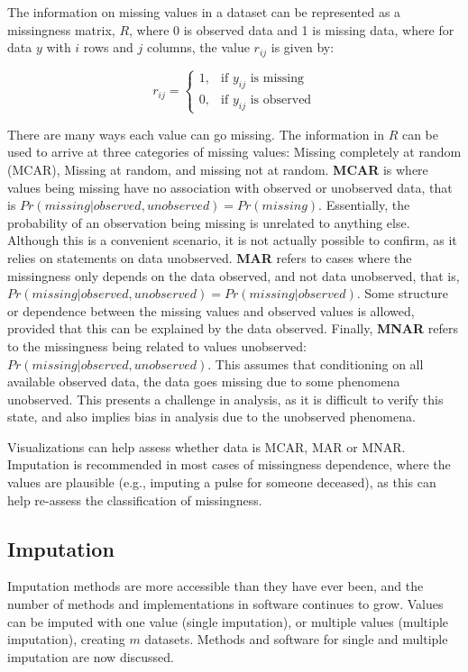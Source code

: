 \documentclass[]{article}
\theoremstyle{definition}
\theoremstyle{definition}
\theoremstyle{definition}
\theoremstyle{remark}
\begin{document}
The information on missing values in a dataset can be represented as a
missingness matrix, \(R\), where 0 is observed data and 1 is missing
data, where for data \(y\) with \(i\) rows and \(j\) columns, the value
\(r_{ij}\) is given by:

\[
r_{ij} =\begin{cases}
1, & \text{if } y_{ij} \text{ is missing} \\
0, & \text{if } y_{ij} \text{ is observed}
\end{cases}
\]

There are many ways each value can go missing. The information in \(R\)
can be used to arrive at three categories of missing values: Missing
completely at random (MCAR), Missing at random, and missing not at
random. \textbf{MCAR} is where values being missing have no association
with observed or unobserved data, that is
\(Pr(missing | observed, unobserved) = Pr(missing)\). Essentially, the
probability of an observation being missing is unrelated to anything
else. Although this is a convenient scenario, it is not actually
possible to confirm, as it relies on statements on data unobserved.
\textbf{MAR} refers to cases where the missingness only depends on the
data observed, and not data unobserved, that
is,\(Pr(missing | observed, unobserved) = Pr(missing | observed)\). Some
structure or dependence between the missing values and observed values
is allowed, provided that this can be explained by the data observed.
Finally, \textbf{MNAR} refers to the missingness being related to values
unobserved: \(Pr(missing | observed, unobserved)\). This assumes that
conditioning on all available observed data, the data goes missing due
to some phenomena unobserved. This presents a challenge in analysis, as
it is difficult to verify this state, and also implies bias in analysis
due to the unobserved phenomena.

Visualizations can help assess whether data is MCAR, MAR or MNAR.
Imputation is recommended in most cases of missingness dependence, where
the values are plausible (e.g., imputing a pulse for someone deceased),
as this can help re-assess the classification of missingness.

\hypertarget{imputation}{%
\subsection{Imputation}\label{imputation}}

Imputation methods are more accessible than they have ever been, and the
number of methods and implementations in software continues to grow.
Values can be imputed with one value (single imputation), or multiple
values (multiple imputation), creating \(m\) datasets. Methods and
software for single and multiple imputation are now discussed.
\end{document}
